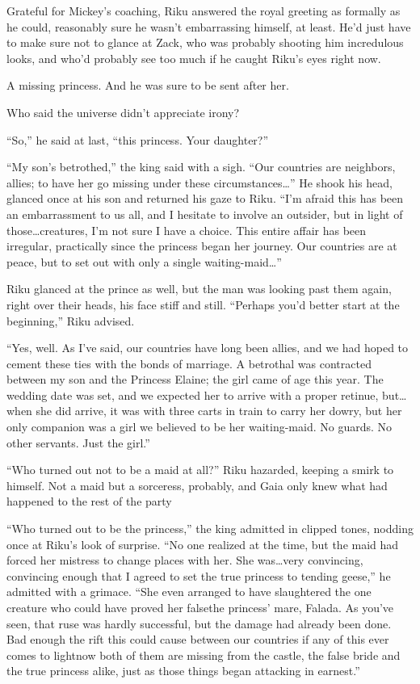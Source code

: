 Grateful for Mickey's coaching, Riku answered the royal greeting as formally as he could, reasonably sure he wasn't embarrassing himself, at least. He'd just have to make sure not to glance at Zack, who was probably shooting him incredulous looks, and who'd probably see too much if he caught Riku's eyes right now.

A missing princess. And he was sure to be sent after her.

Who said the universe didn't appreciate irony?

``So,'' he said at last, ``this princess. Your daughter?''

``My son's betrothed,'' the king said with a sigh. ``Our countries are neighbors, allies; to have her go missing under these circumstances\ldots '' He shook his head, glanced once at his son and returned his gaze to Riku. ``I'm afraid this has been an embarrassment to us all, and I hesitate to involve an outsider, but in light of those\ldots creatures, I'm not sure I have a choice. This entire affair has been irregular, practically since the princess began her journey. Our countries are at peace, but to set out with only a single waiting-maid\ldots ''

Riku glanced at the prince as well, but the man was looking past them again, right over their heads, his face stiff and still. ``Perhaps you'd better start at the beginning,'' Riku advised.

``Yes, well. As I've said, our countries have long been allies, and we had hoped to cement these ties with the bonds of marriage. A betrothal was contracted between my son and the Princess Elaine; the girl came of age this year. The wedding date was set, and we expected her to arrive with a proper retinue, but\ldots when she did arrive, it was with three carts in train to carry her dowry, but her only companion was a girl we believed to be her waiting-maid. No guards. No other servants. Just the girl.''

``Who turned out not to be a maid at all?'' Riku hazarded, keeping a smirk to himself. Not a maid but a sorceress, probably, and Gaia only knew what had happened to the rest of the party\textemdash 

``Who turned out to be the princess,'' the king admitted in clipped tones, nodding once at Riku's look of surprise. ``No one realized at the time, but the maid had forced her mistress to change places with her. She was\ldots very convincing, convincing enough that I agreed to set the true princess to tending geese,'' he admitted with a grimace. ``She even arranged to have slaughtered the one creature who could have proved her false\textemdash the princess' mare, Falada. As you've seen, that ruse was hardly successful, but the damage had already been done. Bad enough the rift this could cause between our countries if any of this ever comes to light\textemdash now both of them are missing from the castle, the false bride and the true princess alike, just as those things began attacking in earnest.''

